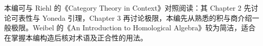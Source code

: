 \ProseParagraphBreak
本编可与 Riehl 的《Category Theory in Context》\cite[Chapters 1--4]{Riehl2016CategoryTheory}对照阅读：其 Chapter 2 先讨论可表性与 Yoneda 引理，Chapter 3 再讨论极限，本编先从熟悉的积与商介绍一般极限。Weibel 的《An Introduction to Homological Algebra》\cite[Sections A.1--A.6; Section 1.6]{Weibel1994HomologicalAlgebra}较为简洁，适合在掌握本编构造后核对术语及正合性的用法。







